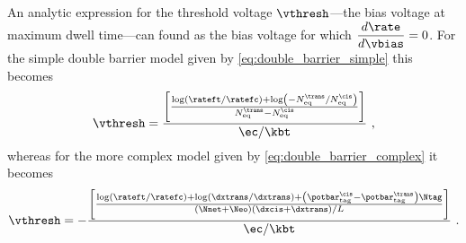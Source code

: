 An analytic expression for the threshold voltage $\vthresh$---the bias voltage at maximum dwell time---can
found as the bias voltage for which $\dfrac{d\rate}{d\vbias} = 0$. For the simple double barrier model given
by \cref{eq:double_barrier_simple} this becomes
%
\begin{align}\label{eq:threshold_voltage_simple}
	\vthresh = \dfrac{ \left[
	\frac{%
	\log \left( \rateft / \ratefc \right)+
	\log \left( -N_{\rm{eq}}^\trans / N_{\rm{eq}}^\cis \right)
	}{%
		N_{\rm{eq}}^\trans - N_{\rm{eq}}^\cis
  }\right]}%
  { \ec / \kbt }
  \text{ ,}
\end{align}
%
whereas for the more complex model given by \cref{eq:double_barrier_complex} it becomes
%
\begin{equation}\label{eq:threshold_voltage_complex}
	\vthresh = - \dfrac{\left[
	\frac{%
	\log \left( \rateft / \ratefc \right)
	+ \log \left( \dxtrans / \dxtrans \right)
	+ \left( \potbar_{\rm{tag}}^{\cis} - \potbar_{\rm{tag}}^{\trans} \right)\Ntag
	}{%
		\left( \Nnet + \Neo \right) \left(\dxcis + \dxtrans \right) / L
  }\right]}%
  { \ec / \kbt }
  \text{ .}
\end{equation}
%



\cleardoublepage

